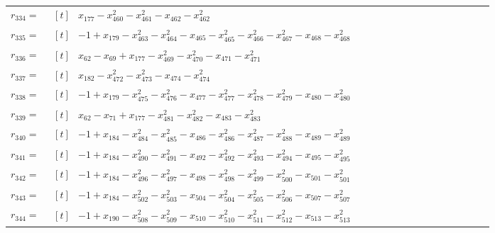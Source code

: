 \begin{longtable}{@{}r p{0.92\linewidth}@{}}
$r_{334}=$ & $\begin{aligned}[t]&x_{177}-x_{460}^{2}-x_{461}^{2}-x_{462}-x_{462}^{2}\end{aligned}$ \\[2pt]
$r_{335}=$ & $\begin{aligned}[t]&-1+x_{179}-x_{463}^{2}-x_{464}^{2}-x_{465}-x_{465}^{2}-x_{466}^{2}-x_{467}^{2}-x_{468}-x_{468}^{2}\end{aligned}$ \\[2pt]
$r_{336}=$ & $\begin{aligned}[t]&x_{62}-x_{69}+x_{177}-x_{469}^{2}-x_{470}^{2}-x_{471}-x_{471}^{2}\end{aligned}$ \\[2pt]
$r_{337}=$ & $\begin{aligned}[t]&x_{182}-x_{472}^{2}-x_{473}^{2}-x_{474}-x_{474}^{2}\end{aligned}$ \\[2pt]
$r_{338}=$ & $\begin{aligned}[t]&-1+x_{179}-x_{475}^{2}-x_{476}^{2}-x_{477}-x_{477}^{2}-x_{478}^{2}-x_{479}^{2}-x_{480}-x_{480}^{2}\end{aligned}$ \\[2pt]
$r_{339}=$ & $\begin{aligned}[t]&x_{62}-x_{71}+x_{177}-x_{481}^{2}-x_{482}^{2}-x_{483}-x_{483}^{2}\end{aligned}$ \\[2pt]
$r_{340}=$ & $\begin{aligned}[t]&-1+x_{184}-x_{484}^{2}-x_{485}^{2}-x_{486}-x_{486}^{2}-x_{487}^{2}-x_{488}^{2}-x_{489}-x_{489}^{2}\end{aligned}$ \\[2pt]
$r_{341}=$ & $\begin{aligned}[t]&-1+x_{184}-x_{490}^{2}-x_{491}^{2}-x_{492}-x_{492}^{2}-x_{493}^{2}-x_{494}^{2}-x_{495}-x_{495}^{2}\end{aligned}$ \\[2pt]
$r_{342}=$ & $\begin{aligned}[t]&-1+x_{184}-x_{496}^{2}-x_{497}^{2}-x_{498}-x_{498}^{2}-x_{499}^{2}-x_{500}^{2}-x_{501}-x_{501}^{2}\end{aligned}$ \\[2pt]
$r_{343}=$ & $\begin{aligned}[t]&-1+x_{184}-x_{502}^{2}-x_{503}^{2}-x_{504}-x_{504}^{2}-x_{505}^{2}-x_{506}^{2}-x_{507}-x_{507}^{2}\end{aligned}$ \\[2pt]
$r_{344}=$ & $\begin{aligned}[t]&-1+x_{190}-x_{508}^{2}-x_{509}^{2}-x_{510}-x_{510}^{2}-x_{511}^{2}-x_{512}^{2}-x_{513}-x_{513}^{2}\end{aligned}$ \\[2pt]

\end{longtable}
